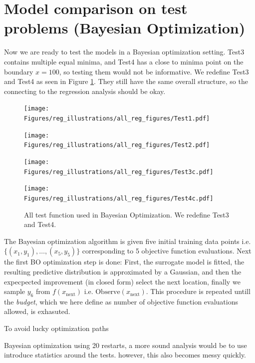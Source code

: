 \section{Model comparison on test problems (Bayesian Optimization)}
Now we are ready to test the models in a Bayesian optimization setting. Test3 contains multiple
equal minima, and Test4 has a close to minima point on the boundary $x=100$, so testing them would
not be informative. We redefine Test3 and Test4 as seen in Figure \ref{TEST_problems2}. They still
have the same overall structure, so the connecting to the regression analysis should be okay. 

\begin{figure}[b]
  \centering
  \begin{minipage}[b]{0.24\textwidth}
   \texttt{[image: Figures/reg\_illustrations/all\_reg\_figures/Test1.pdf]}
  \end{minipage}
  \hfill
  \begin{minipage}[b]{0.24\textwidth}
    \texttt{[image: Figures/reg\_illustrations/all\_reg\_figures/Test2.pdf]}
   \end{minipage}
   \hfill
   \begin{minipage}[b]{0.24\textwidth}
    \texttt{[image: Figures/reg\_illustrations/all\_reg\_figures/Test3c.pdf]}
   \end{minipage}
   \hfill
   \begin{minipage}[b]{0.24\textwidth}
     \texttt{[image: Figures/reg\_illustrations/all\_reg\_figures/Test4c.pdf]}
    \end{minipage}
  \caption{All test function used in Bayesian Optimization. We redefine Test3 and Test4.}
  \label{TEST_problems2}
\end{figure}

The Bayesian optimization algorithm is given five initial training data points i.e. $\{(x_1, y_1),
\dots, (x_5, y_5)\}$ corresponding to 5 objective function evaluations. Next the first BO
optimization step is done: First, the surrogate model is fitted, the resulting predictive
distribution is approximated by a Gaussian, and then the expecpected improvement (in closed form)
select the next location, finally we sample $y_6$ from $f(x_{\text{next}})$ i.e.
$\text{Observe}(x_{\text{next}})$. This procedure is repeated untill the \textit{budget}, which we
here define as number of objective function evaluations allowed, is exhasuted. 


To avoid 
lucky optimization paths 

Bayesian optimization using 20 restarts, 
 a more sound analysis would be to use introduce statistics around the tests. however, this also becomes messy quickly. 



